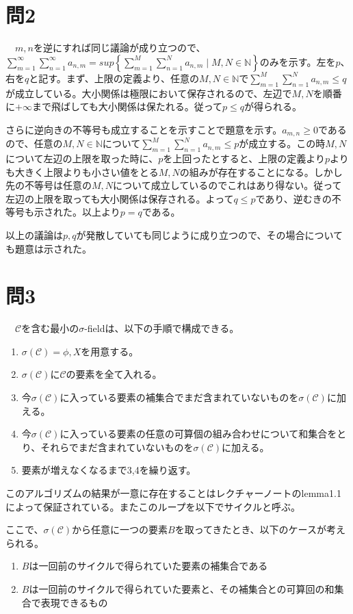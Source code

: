 \documentclass{article}
\begin{document}
\section{問2}
　$m, n$を逆にすれば同じ議論が成り立つので、$\sum_{m=1}^{\infty} \sum_{n = 1}^{\infty} a_{n,m} = sup\left\{ \sum_{m=1}^{M} \sum_{n = 1}^{N} a_{n,m} \mid M, N \in \mathbb{N}\right\}$のみを示す。左を$p$、右を$q$と記す。まず、上限の定義より、任意の$M, N \in \mathbb{N}$で$\sum_{m=1}^{M} \sum_{n = 1}^{N} a_{n,m} \leq q$が成立している。大小関係は極限において保存されるので、左辺で$M, N$を順番に$+\infty$まで飛ばしても大小関係は保たれる。従って$p \leq q$が得られる。

さらに逆向きの不等号も成立することを示すことで題意を示す。$a_{m,n} \geq 0$であるので、任意の$M, N \in \mathbb{N}$について$\sum_{m=1}^{M} \sum_{n = 1}^{N} a_{n,m} \leq p$が成立する。この時$M, N$について左辺の上限を取った時に、$p$を上回ったとすると、上限の定義より$p$よりも大きく上限よりも小さい値をとる$M, N$の組みが存在することになる。しかし先の不等号は任意の$M, N$について成立しているのでこれはあり得ない。従って左辺の上限を取っても大小関係は保存される。よって$q \leq p$であり、逆むきの不等号も示された。以上より$p = q$である。

以上の議論は$p, q$が発散していても同じように成り立つので、その場合についても題意は示された。

\section{問3}
　$\mathcal{C}$を含む最小の$\sigma$-fieldは、以下の手順で構成できる。
\begin{enumerate}
	\item $\sigma(\mathcal{C}) = \phi, X$を用意する。
	\item $\sigma(\mathcal{C})$に$\mathcal{C}$の要素を全て入れる。
	\item 今$\sigma(\mathcal{C})$に入っている要素の補集合でまだ含まれていないものを$\sigma(\mathcal{C})$に加える。
	\item 今$\sigma(\mathcal{C})$に入っている要素の任意の可算個の組み合わせについて和集合をとり、それらでまだ含まれていないものを$\sigma(\mathcal{C})$に加える。
	\item 要素が増えなくなるまで3,4を繰り返す。
\end{enumerate}
このアルゴリズムの結果が一意に存在することはレクチャーノートのlemma1.1によって保証されている。またこのループを以下でサイクルと呼ぶ。

ここで、$\sigma(\mathcal{C})$から任意に一つの要素$B$を取ってきたとき、以下のケースが考えられる。
\begin{enumerate}
	\item $B$は一回前のサイクルで得られていた要素の補集合である
	\item $B$は一回前のサイクルで得られていた要素と、その補集合との可算回の和集合で表現できるもの
\end{enumerate}
\end{document}
